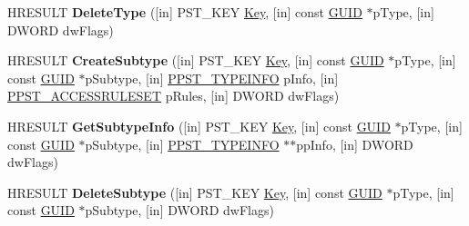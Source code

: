 \begin{DoxyCompactItemize}
\item 
\mbox{\label{interface_p_s_t_o_r_e_c_lib_1_1_i_p_store_a8df671aadf6766504ec7f4a146ae29ed}} 
H\+R\+E\+S\+U\+LT {\bfseries Delete\+Type} (\mbox{[}in\mbox{]} P\+S\+T\+\_\+\+K\+EY \hyperlink{struct_key}{Key}, \mbox{[}in\mbox{]} const \hyperlink{interface_g_u_i_d}{G\+U\+ID} $\ast$p\+Type, \mbox{[}in\mbox{]} D\+W\+O\+RD dw\+Flags)
\item 
\mbox{\label{interface_p_s_t_o_r_e_c_lib_1_1_i_p_store_a73e9d9ed17d049a3728a20e2e77a41d4}} 
H\+R\+E\+S\+U\+LT {\bfseries Create\+Subtype} (\mbox{[}in\mbox{]} P\+S\+T\+\_\+\+K\+EY \hyperlink{struct_key}{Key}, \mbox{[}in\mbox{]} const \hyperlink{interface_g_u_i_d}{G\+U\+ID} $\ast$p\+Type, \mbox{[}in\mbox{]} const \hyperlink{interface_g_u_i_d}{G\+U\+ID} $\ast$p\+Subtype, \mbox{[}in\mbox{]} \hyperlink{struct_p_s_t_o_r_e_c_lib_1_1___p_s_t___t_y_p_e_i_n_f_o}{P\+P\+S\+T\+\_\+\+T\+Y\+P\+E\+I\+N\+FO} p\+Info, \mbox{[}in\mbox{]} \hyperlink{struct_p_s_t_o_r_e_c_lib_1_1___p_s_t___a_c_c_e_s_s_r_u_l_e_s_e_t}{P\+P\+S\+T\+\_\+\+A\+C\+C\+E\+S\+S\+R\+U\+L\+E\+S\+ET} p\+Rules, \mbox{[}in\mbox{]} D\+W\+O\+RD dw\+Flags)
\item 
\mbox{\label{interface_p_s_t_o_r_e_c_lib_1_1_i_p_store_a2d6ad861611d88124c377981088ee3ef}} 
H\+R\+E\+S\+U\+LT {\bfseries Get\+Subtype\+Info} (\mbox{[}in\mbox{]} P\+S\+T\+\_\+\+K\+EY \hyperlink{struct_key}{Key}, \mbox{[}in\mbox{]} const \hyperlink{interface_g_u_i_d}{G\+U\+ID} $\ast$p\+Type, \mbox{[}in\mbox{]} const \hyperlink{interface_g_u_i_d}{G\+U\+ID} $\ast$p\+Subtype, \mbox{[}in\mbox{]} \hyperlink{struct_p_s_t_o_r_e_c_lib_1_1___p_s_t___t_y_p_e_i_n_f_o}{P\+P\+S\+T\+\_\+\+T\+Y\+P\+E\+I\+N\+FO} $\ast$$\ast$pp\+Info, \mbox{[}in\mbox{]} D\+W\+O\+RD dw\+Flags)
\item 
\mbox{\label{interface_p_s_t_o_r_e_c_lib_1_1_i_p_store_a78080a988c99a1c2f725a9f5cf222aca}} 
H\+R\+E\+S\+U\+LT {\bfseries Delete\+Subtype} (\mbox{[}in\mbox{]} P\+S\+T\+\_\+\+K\+EY \hyperlink{struct_key}{Key}, \mbox{[}in\mbox{]} const \hyperlink{interface_g_u_i_d}{G\+U\+ID} $\ast$p\+Type, \mbox{[}in\mbox{]} const \hyperlink{interface_g_u_i_d}{G\+U\+ID} $\ast$p\+Subtype, \mbox{[}in\mbox{]} D\+W\+O\+RD dw\+Flags)
\item 
$$
\end{DoxyCompactItemize}
